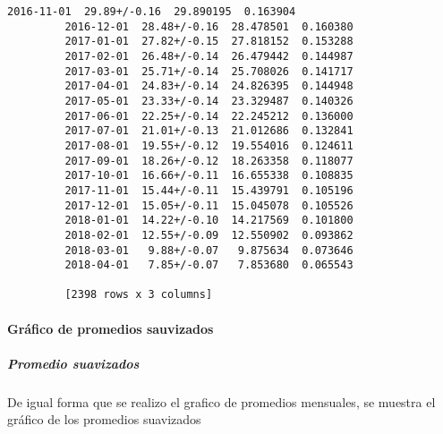\documentclass[11pt]{article}
\begin{document}
\begin{Verbatim}[commandchars=\\\{\}]
         2016-11-01  29.89+/-0.16  29.890195  0.163904
         2016-12-01  28.48+/-0.16  28.478501  0.160380
         2017-01-01  27.82+/-0.15  27.818152  0.153288
         2017-02-01  26.48+/-0.14  26.479442  0.144987
         2017-03-01  25.71+/-0.14  25.708026  0.141717
         2017-04-01  24.83+/-0.14  24.826395  0.144948
         2017-05-01  23.33+/-0.14  23.329487  0.140326
         2017-06-01  22.25+/-0.14  22.245212  0.136000
         2017-07-01  21.01+/-0.13  21.012686  0.132841
         2017-08-01  19.55+/-0.12  19.554016  0.124611
         2017-09-01  18.26+/-0.12  18.263358  0.118077
         2017-10-01  16.66+/-0.11  16.655338  0.108835
         2017-11-01  15.44+/-0.11  15.439791  0.105196
         2017-12-01  15.05+/-0.11  15.045078  0.105526
         2018-01-01  14.22+/-0.10  14.217569  0.101800
         2018-02-01  12.55+/-0.09  12.550902  0.093862
         2018-03-01   9.88+/-0.07   9.875634  0.073646
         2018-04-01   7.85+/-0.07   7.853680  0.065543
         
         [2398 rows x 3 columns]
\end{Verbatim}
            
    \hypertarget{gruxe1fico-de-promedios-sauvizados}{%
\paragraph{Gráfico de promedios
sauvizados}\label{gruxe1fico-de-promedios-sauvizados}}

    \hypertarget{promedio-suavizados}{%
\subparagraph{\texorpdfstring{\textbf{Promedio
suavizados}}{Promedio suavizados}}\label{promedio-suavizados}}

    De igual forma que se realizo el grafico de promedios mensuales, se
muestra el gráfico de los promedios suavizados
\end{document}
